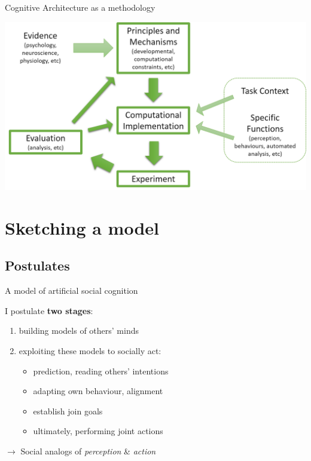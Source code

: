 \documentclass[compress]{beamer}
\begin{document}
{
\begin{frame}{Cognitive Architecture as a methodology}

    \begin{center}
        \includegraphics[width=\linewidth]{cogarch-methodology}
    \end{center}

\end{frame}
}

\section{Sketching a model}
\subsection{Postulates}
\begin{frame}{A model of artificial social cognition}

    I postulate {\bf two stages}:

    \begin{enumerate}
        \item building models of others' minds
        \item exploiting these models to socially act:
            \begin{itemize}
                \item prediction, reading others' intentions
                \item adapting own behaviour, alignment
                \item establish join goals
                \item ultimately, performing joint actions
            \end{itemize}
    \end{enumerate}

    \vspace{2em}
    $\rightarrow$ Social analogs of \emph{perception} \& \emph{action}

\end{frame}
\end{document}
